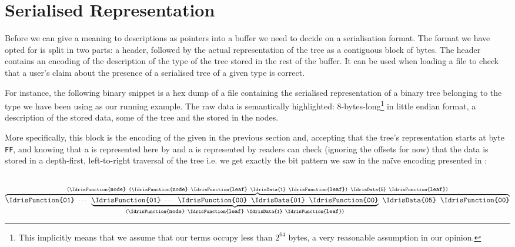 \section{Serialised Representation}\label{sec:hexdump}

Before we can give a meaning to descriptions as pointers into a
buffer we need to decide on a serialisation format.
%
The format we have opted for is split in two parts: a header, followed
by the actual representation of the tree as a contiguous block of bytes.
%
The header contains an encoding of the description of the type of the
tree stored in the rest of the buffer.
%
It can be used when loading a file to check that a user's claim about
the presence of a serialised tree of a given type is correct.


For instance, the following binary snippet is a hex dump of a file
containing the serialised representation of a binary tree belonging to
the type we have been using as our running example.
%
The raw data is semantically highlighted:
8-bytes-long\footnote{This implicitly means that we assume
that our terms occupy less than $2^{64}$ bytes,
a very reasonable assumption in our opinion.}
 in little endian format,
a  description of the stored data,
some  of the tree
and the  stored in the nodes.

\begin{center}

\end{center}

More specifically, this block is the encoding of the 
given in the previous section and,
%
accepting that the tree's representation starts at byte \texttt{FF}, and
%
knowing that a  is represented here by 
and a  is represented by 
%
readers can check
(ignoring the offsets for now)
that the data is stored in a depth-first, left-to-right traversal of the tree
i.e. we get exactly the bit pattern we saw in the naïve encoding
presented in :

\begin{center}
  \usestt
      \texttt{ \hexaoffset{$\cdots$} $\overbrace{\texttt{\IdrisFunction{01} \hexaoffset{$\cdots$}  $\underbrace{\texttt{\IdrisFunction{01} \hexaoffset{$\cdots$}  \IdrisFunction{00} \IdrisData{01} \IdrisFunction{00}}}_{\texttt{(\IdrisFunction{\footnotesize{node}} \IdrisFunction{\footnotesize{leaf}} \IdrisData{1} \IdrisFunction{\footnotesize{leaf}})}}$
    \IdrisData{05} \IdrisFunction{00}}}^{\texttt{(\IdrisFunction{\footnotesize{node}} (\IdrisFunction{\footnotesize{node}} \IdrisFunction{\footnotesize{leaf}} \IdrisData{1} \IdrisFunction{\footnotesize{leaf}}) \IdrisData{5} \IdrisFunction{\footnotesize{leaf}})}}$
      \hexaoffset{$\cdots$}    }
\end{center}

